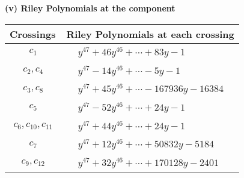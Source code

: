 \documentclass[1p]{elsarticle_modified}
\theoremstyle{definition}
\begin{document}
\newpage\renewcommand{\arraystretch}{1}
\flushleft \textbf{(v) Riley Polynomials at the component}\newline \\
\begin{tabular}{m{50pt}|m{274pt}}
Crossings & \hspace{64pt}Riley Polynomials at each crossing \\
\hline $$\begin{aligned}c_{1}\end{aligned}$$&$\begin{aligned}
&y^{47}+46 y^{46}+\cdots+83 y-1
\end{aligned}$\\
\hline $$\begin{aligned}c_{2},c_{4}\end{aligned}$$&$\begin{aligned}
&y^{47}-14 y^{46}+\cdots-5 y-1
\end{aligned}$\\
\hline $$\begin{aligned}c_{3},c_{8}\end{aligned}$$&$\begin{aligned}
&y^{47}+45 y^{46}+\cdots-167936 y-16384
\end{aligned}$\\
\hline $$\begin{aligned}c_{5}\end{aligned}$$&$\begin{aligned}
&y^{47}-52 y^{46}+\cdots+24 y-1
\end{aligned}$\\
\hline $$\begin{aligned}c_{6},c_{10},c_{11}\end{aligned}$$&$\begin{aligned}
&y^{47}+44 y^{46}+\cdots+24 y-1
\end{aligned}$\\
\hline $$\begin{aligned}c_{7}\end{aligned}$$&$\begin{aligned}
&y^{47}+12 y^{46}+\cdots+50832 y-5184
\end{aligned}$\\
\hline $$\begin{aligned}c_{9},c_{12}\end{aligned}$$&$\begin{aligned}
&y^{47}+32 y^{46}+\cdots+170128 y-2401
\end{aligned}$\\
\hline
\end{tabular}\\~\\
\end{document}
